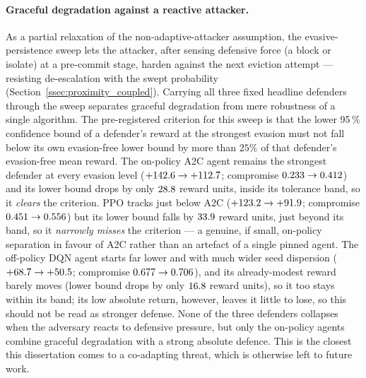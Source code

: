 \paragraph{Graceful degradation against a reactive attacker.} As a partial relaxation of the non-adaptive-attacker assumption, the evasive-persistence sweep lets the attacker, after sensing defensive force (a block or isolate) at a pre-commit stage, harden against the next eviction attempt --- resisting de-escalation with the swept probability (Section~\ref{ssec:proximity_coupled}). Carrying all three fixed headline defenders through the sweep separates graceful degradation from mere robustness of a single algorithm. The pre-registered criterion for this sweep is that the lower 95\,\% confidence bound of a defender's reward at the strongest evasion must not fall below its own evasion-free lower bound by more than $25\%$ of that defender's evasion-free mean reward. The on-policy A2C agent remains the strongest defender at every evasion level ($+142.6 \to +112.7$; compromise $0.233 \to 0.412$) and its lower bound drops by only $28.8$ reward units, inside its tolerance band, so it \emph{clears} the criterion. PPO tracks just below A2C ($+123.2 \to +91.9$; compromise $0.451 \to 0.556$) but its lower bound falls by $33.9$ reward units, just beyond its band, so it \emph{narrowly misses} the criterion --- a genuine, if small, on-policy separation in favour of A2C rather than an artefact of a single pinned agent. The off-policy DQN agent starts far lower and with much wider seed dispersion ($+68.7 \to +50.5$; compromise $0.677 \to 0.706$), and its already-modest reward barely moves (lower bound drops by only $16.8$ reward units), so it too stays within its band; its low absolute return, however, leaves it little to lose, so this should not be read as stronger defense. None of the three defenders collapses when the adversary reacts to defensive pressure, but only the on-policy agents combine graceful degradation with a strong absolute defence. This is the closest this dissertation comes to a co-adapting threat, which is otherwise left to future work.

\clearpage
